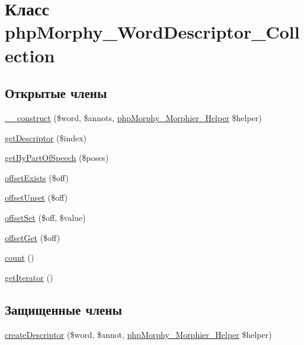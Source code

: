 \hypertarget{classphpMorphy__WordDescriptor__Collection}{
\section{Класс phpMorphy\_\-WordDescriptor\_\-Collection}
\label{classphpMorphy__WordDescriptor__Collection}
}
\subsection*{Открытые члены}
\begin{DoxyCompactItemize}
\item 
\hyperlink{classphpMorphy__WordDescriptor__Collection_a6f7d94a21a8540419e10b7bdb20806b6}{\_\-\_\-construct} (\$word, \$annots, \hyperlink{classphpMorphy__Morphier__Helper}{phpMorphy\_\-Morphier\_\-Helper} \$helper)
\item 
\hyperlink{classphpMorphy__WordDescriptor__Collection_ab00012115e56039d49388ec2f2d330b1}{getDescriptor} (\$index)
\item 
\hyperlink{classphpMorphy__WordDescriptor__Collection_af76899f439eb134c417c10c19e912138}{getByPartOfSpeech} (\$poses)
\item 
\hyperlink{classphpMorphy__WordDescriptor__Collection_ac1eb2dc8ba9af61d5e89b7fbf72bbf79}{offsetExists} (\$off)
\item 
\hyperlink{classphpMorphy__WordDescriptor__Collection_a88efbada3d860b06407098062339d191}{offsetUnset} (\$off)
\item 
\hyperlink{classphpMorphy__WordDescriptor__Collection_adea43ddd3e19fd2e4562e5224e618bff}{offsetSet} (\$off, \$value)
\item 
\hyperlink{classphpMorphy__WordDescriptor__Collection_a5463c0c604a5c4393eab197d25d072fb}{offsetGet} (\$off)
\item 
\hyperlink{classphpMorphy__WordDescriptor__Collection_addcc7f3807d8361cca9a422933574a03}{count} ()
\item 
\hyperlink{classphpMorphy__WordDescriptor__Collection_a016fbdb8c9b27111aab2bc9951576a2e}{getIterator} ()
\end{DoxyCompactItemize}
\subsection*{Защищенные члены}
\begin{DoxyCompactItemize}
\item 
\hyperlink{classphpMorphy__WordDescriptor__Collection_a1305d34dfe7e112ae3e403118e2ebb15}{createDescriptor} (\$word, \$annot, \hyperlink{classphpMorphy__Morphier__Helper}{phpMorphy\_\-Morphier\_\-Helper} \$helper)
\end{DoxyCompactItemize}
